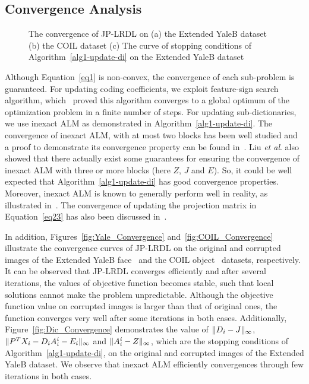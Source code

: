\documentclass[journal]{IEEEtran}
\newcommand{\etal}{\textit{et al}.}
\DeclarePairedDelimiter\norm{\lVert}{\rVert}
\begin{document}
\subsection{Convergence Analysis}
\begin{figure}[t]
\centering
{}  
\hspace{2pt} 
\vspace{-0.1em}
\caption{The convergence of JP-LRDL on (a) the Extended YaleB dataset (b) the COIL dataset (c) The curve of stopping conditions of Algorithm~\ref{alg1-update-di} on the Extended YaleB dataset}
\vspace{-1.5em}
\end{figure} 
Although Equation~\eqref{eq1} is non-convex, the convergence of each sub-problem is guaranteed. For updating coding coefficients, we exploit feature-sign search algorithm, which~\cite{Feature-Sign} proved this algorithm converges to a global optimum of the optimization problem in a finite number of steps. For updating sub-dictionaries, we use inexact ALM as demonstrated in Algorithm~\ref{alg1-update-di}. The convergence of inexact ALM, with at most two blocks has been well studied and a proof to demonstrate its convergence property can be found in~\cite{ALM-Proof}. Liu \etal\cite{IALM-3block} also showed that there actually exist some guarantees for ensuring the convergence of inexact ALM with three or more blocks (here $Z$, $J$ and $E$). So, it could be well expected that Algorithm~\ref{alg1-update-di} has good convergence properties. Moreover, inexact ALM is known to generally perform well in reality, as illustrated in~\cite{ADM-Tutorial}. The convergence of updating the projection matrix in Equation~\eqref{eq23} has also been discussed in~\cite{JDDRDL}. 

In addition, Figures~\ref{fig:Yale_Convergence} and~\ref{fig:COIL_Convergence} illustrate the convergence curves of JP-LRDL on the original and corrupted images of the Extended YaleB face~\cite{Yale} and the COIL object~\cite{COIL} datasets, respectively. It can be observed that JP-LRDL converges efficiently and after several iterations, the values of objective function becomes stable, such that local solutions cannot make the problem unpredictable. Although the objective function value on corrupted images is larger than that of original ones, the function converges very well after some iterations in both cases. Additionally, Figure~\ref{fig:Dic_Convergence} demonstrates the value of $\norm{D_i - J}_{\infty}$, $\norm{P^T X_i - D_i A_i^i - E_i}_{\infty}$ and $\norm{A_i^i - Z}_{\infty}$, which are the stopping conditions of Algorithm~\ref{alg1-update-di}, on the original and corrupted images of the Extended YaleB dataset. We observe that inexact ALM efficiently convergences through few iterations in both cases.
\end{document}
